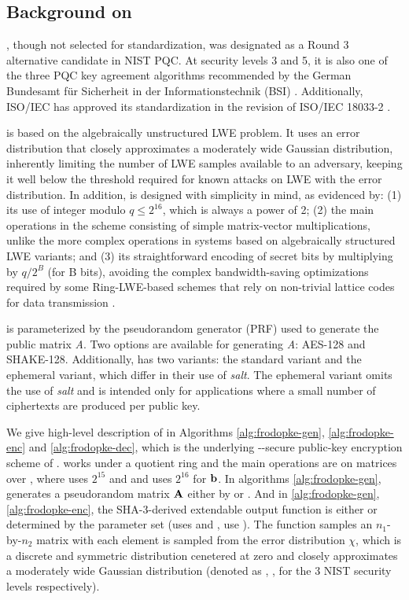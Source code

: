 \subsection{Background on \frodokem}

\frodokem, though not selected for standardization, was designated as a Round 3 alternative candidate 
in NIST PQC. At security levels 3 and 5, it is also one of the three PQC key agreement algorithms 
recommended by the German Bundesamt für Sicherheit in der Informationstechnik (BSI) \cite{}. 
Additionally, ISO/IEC has approved its standardization in the revision of ISO/IEC 18033-2 \cite{}.

\frodokem is based on the algebraically unstructured LWE problem. It uses an error distribution that 
closely approximates a moderately wide Gaussian distribution, inherently limiting the number of LWE samples 
available to an adversary, keeping it well below the threshold required for known attacks on LWE with 
the error distribution. In addition, \frodokem is designed with simplicity in mind, as evidenced by: 
(1) its use of integer modulo  $q \leq 2^{16}$, which is always a power of 2; 
(2) the main operations in the scheme consisting of simple matrix-vector multiplications, 
unlike the more complex operations in systems based on algebraically structured LWE variants; 
and (3) its straightforward encoding of secret bits by multiplying by  $q / 2^B$  (for  B  bits), 
avoiding the complex bandwidth-saving optimizations required by some Ring-LWE-based schemes that rely on 
non-trivial lattice codes for data transmission \cite{}.

\frodokem is parameterized by the pseudorandom generator (PRF) used to generate the public matrix \textit{A}. 
Two options are available for generating \textit{A}: AES-128 and SHAKE-128. 
Additionally, \frodokem has two variants: the standard variant and the ephemeral variant, which differ in their 
use of \textit{salt}. The ephemeral variant omits the use of \textit{salt} and is intended only for applications 
where a small number of ciphertexts are produced per public key.

We give high-level description of \frodopke in Algorithms \ref{alg:frodopke-gen}, \ref{alg:frodopke-enc} and 
\ref{alg:frodopke-dec}, which is the underlying \IND-\CPA-secure public-key encryption scheme of \frodokem. 
\frodokem works under a quotient ring \Zq and the main operations are on matrices over \Zq, where \frodolow 
uses $2^{15}$ and \frodomid and \frodohigh uses $2^{16}$ for $\mathbf{b}$. In algorithms \ref{alg:frodopke-gen}, 
\GenA generates a pseudorandom matrix $\mathbf{A}$ either by \shakesmall or \aessmall. And in \ref{alg:frodopke-gen}, 
\ref{alg:frodopke-enc}, the SHA-3-derived extendable output function \shake is either \shakesmall or \shakebig 
determined by the parameter set (\frodolow uses \shakesmall and \frodomid, \frodohigh use \shakebig). 
The \SampleMatrix function samples an $n_1$-by-$n_2$ matrix with each element is sampled from the error 
distribution $\chi$, which is a discrete and symmetric distribution cenetered at zero and closely approximates 
a moderately wide Gaussian distribution (denoted as \chifrodolow, \chifrodomid, \chifrodohigh for the 3 NIST 
security levels respectively). 

